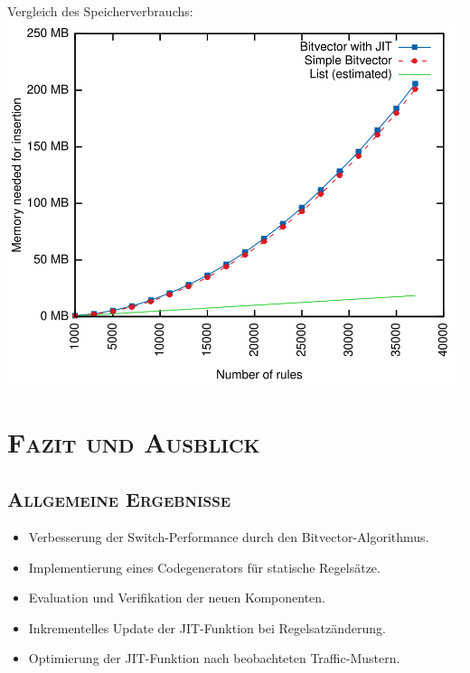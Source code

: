 \documentclass[xcolor=x11names,compress]{beamer}
\renewcommand{\(}{\begin{columns}}
\renewcommand{\)}{\end{columns}}
\newcommand{\<}[1]{\begin{column}{#1}}
\renewcommand{\>}{\end{column}}
\begin{document}
\begin{frame}
  Vergleich des Speicherverbrauchs:
  \includegraphics[height=0.9\textheight]{figures/eval_mem}
\end{frame}

\section{\scshape Fazit und Ausblick}
\begin{frame}
  \centering\Huge{\insertsection}
\end{frame}

\subsection{\scshape Allgemeine Ergebnisse}
\begin{frame}
  \begin{tcolorbox}[colback=yellow!5!white,colframe=yellow!75!black,title=Wichtigste Ergebnisse,drop fuzzy shadow]
    \begin{itemize}
      \item Verbesserung der Switch-Performance durch den Bitvector-Algorithmus.
      \item Implementierung eines Codegenerators für statische Regelsätze.
      \item Evaluation und Verifikation der neuen Komponenten.
    \end{itemize}
  \end{tcolorbox}
  \pause
  \begin{tcolorbox}[colback=blue!5!white,colframe=blue!75!black,title=Künftige Anknüpfungspunkte,drop fuzzy shadow]
    \begin{itemize}
      \item Inkrementelles Update der JIT-Funktion bei Regelsatzänderung.
      \item Optimierung der JIT-Funktion nach beobachteten Traffic-Mustern.
    \end{itemize}
  \end{tcolorbox}
\end{frame}
\end{document}
